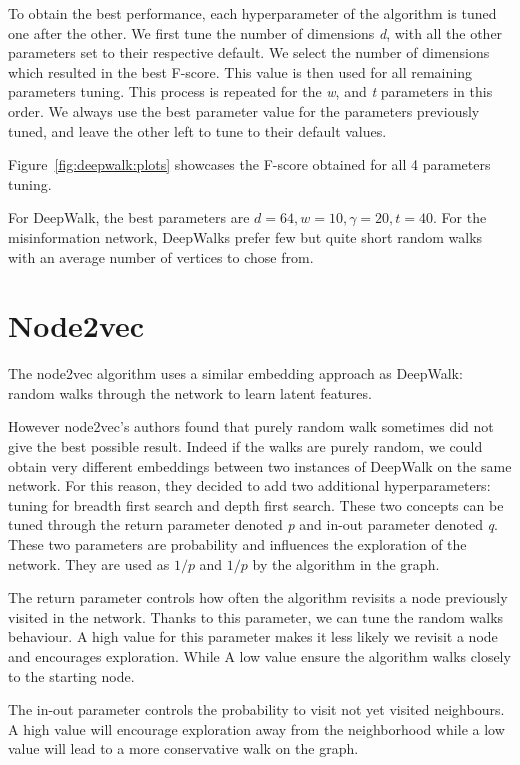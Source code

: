 To obtain the best performance, each hyperparameter of the algorithm is tuned one after the other.
We first tune the number of dimensions \textit{d}, with all the other parameters set to their respective default.
We select the number of dimensions which resulted in the best F-score.
This value is then used for all remaining parameters tuning.
This process is repeated for the \textit{w}, \textit{\gamma} and \textit{t} parameters in this order.
We always use the best parameter value for the parameters previously tuned, and leave the other left to tune to their default values.

Figure~\ref{fig:deepwalk:plots} showcases the F-score obtained for all 4 parameters tuning.

For DeepWalk, the best parameters are $d=64, w=10, \gamma=20, t=40$.
For the misinformation network, DeepWalks prefer few but quite short random walks with an average number of vertices to chose from.

\newpage
\section{Node2vec}

The node2vec algorithm uses a similar embedding approach as DeepWalk: random walks through the network to learn latent features.

However node2vec's authors found that purely random walk sometimes did not give the best possible result.
Indeed if the walks are purely random, we could obtain very different embeddings between two instances of DeepWalk on the same network.
For this reason, they decided to add two additional hyperparameters: tuning for breadth first search and depth first search.
These two concepts can be tuned through the return parameter denoted \textit{p} and in-out parameter denoted \textit{q}.
These two parameters are probability and influences the exploration of the network.
They are used as $1/p$ and $1/p$ by the algorithm in the graph.

The return parameter controls how often the algorithm revisits a node previously visited in the network.
Thanks to this parameter, we can tune the random walks behaviour.
A high value for this parameter makes it less likely we revisit a node and encourages exploration.
While A low value ensure the algorithm walks closely to the starting node.

The in-out parameter controls the probability to visit not yet visited neighbours. A high value will encourage exploration away from the neighborhood while a low value will lead to a more conservative walk on the graph. 

